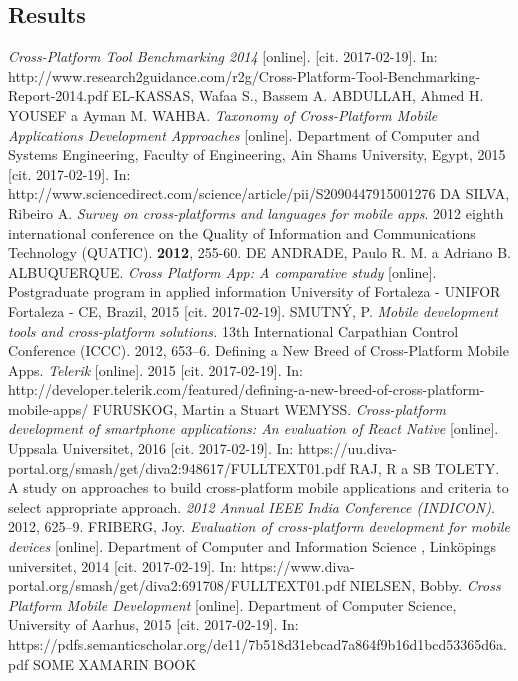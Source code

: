 \documentclass[english,master,public,dept460,male,cpdeclaration,oneside]{diploma}
\begin{document}
\subsection{Results}

\begin{thebibliography}{99}
	 \textit{Cross-Platform Tool Benchmarking 2014} [online]. [cit. 2017-02-19]. In: http://www.research2guidance.com/r2g/Cross-Platform-Tool-Benchmarking-Report-2014.pdf
	EL-KASSAS, Wafaa S., Bassem A. ABDULLAH, Ahmed H. YOUSEF a Ayman M. WAHBA. \textit{Taxonomy of Cross-Platform Mobile Applications Development Approaches} [online]. Department of Computer and Systems Engineering, Faculty of Engineering, Ain Shams University, Egypt, 2015 [cit. 2017-02-19]. In: http://www.sciencedirect.com/science/article/pii/S2090447915001276
	 DA SILVA, Ribeiro A. \textit{Survey on cross-platforms and languages for mobile apps}. 2012 eighth international conference on the Quality of Information and Communications Technology (QUATIC). \textbf{2012}, 255-60.
	DE ANDRADE, Paulo R. M. a Adriano B. ALBUQUERQUE. \textit{Cross Platform App: A comparative study} [online]. Postgraduate program in applied information University of Fortaleza - UNIFOR Fortaleza - CE, Brazil, 2015 [cit. 2017-02-19].
	SMUTNÝ, P. \textit{Mobile development tools and cross-platform solutions.} 13th International Carpathian Control Conference (ICCC). 2012, 653–6.
	 Defining a New Breed of Cross-Platform Mobile Apps. \textit{Telerik} [online]. 2015 [cit. 2017-02-19]. In: http://developer.telerik.com/featured/defining-a-new-breed-of-cross-platform-mobile-apps/
	 FURUSKOG, Martin a Stuart WEMYSS. \textit{Cross-platform development of smartphone applications: An evaluation of React Native} [online]. Uppsala Universitet, 2016 [cit. 2017-02-19]. In: https://uu.diva-portal.org/smash/get/diva2:948617/FULLTEXT01.pdf
	 RAJ, R a SB TOLETY. A study on approaches to build cross-platform mobile applications and criteria to select appropriate approach. \textit{2012 Annual IEEE India Conference (INDICON)}. 2012, 625–9.
	 FRIBERG, Joy. \textit{Evaluation of cross-platform development for mobile devices} [online]. Department of Computer and Information Science , Linköpings universitet, 2014 [cit. 2017-02-19]. In: https://www.diva-portal.org/smash/get/diva2:691708/FULLTEXT01.pdf
	NIELSEN, Bobby. \textit{Cross Platform Mobile Development} [online]. Department of Computer Science, University of Aarhus, 2015 [cit. 2017-02-19]. In: https://pdfs.semanticscholar.org/de11/7b518d31ebcad7a864f9b16d1bcd53365d6a.pdf
	 SOME XAMARIN BOOK
	
\end{thebibliography}
\end{document}
